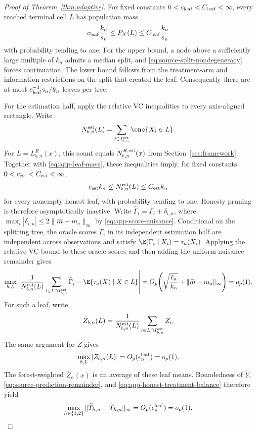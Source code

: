 \begin{appendix}
\begin{proof}[Proof of Theorem~\ref{thm:adaptive}]
For fixed constants \(0<c_{\rm leaf}<C_{\rm leaf}<\infty\), every reached
terminal cell \(L\) has population mass
\begin{equation}\label{eq:app-leaf-mass}
c_{\rm leaf}\frac{k_n}{s_n}\le P_X(L)\le
C_{\rm leaf}\frac{k_n}{s_n}
\end{equation}
with probability tending to one. For the upper bound, a node above a
sufficiently large multiple of \(k_n\) admits a median split, and
\eqref{eq:source-split-nondegeneracy} forces continuation. The lower bound
follows from the treatment-arm and information restrictions on the split that
created the leaf. Consequently there are at most
\(c_{\rm leaf}^{-1}s_n/k_n\) leaves per tree.

For the estimation half, apply the relative VC inequalities to every
axis-aligned rectangle. Write
\[
N_{b,n}^{\rm est}(L)
=\sum_{i\in I_{b,n}^{\rm est}}\one\{X_i\in L\}.
\]
For \(L=L_{b,n}^R(x)\), this count equals
\(N_{b,n}^{R,{\rm est}}(x)\) from Section~\ref{sec:framework}.
Together with \eqref{eq:app-leaf-mass}, these inequalities imply, for fixed
constants \(0<c_{\rm est}<C_{\rm est}<\infty\),
\begin{equation*}
c_{\rm est}k_n\le N_{b,n}^{\rm est}(L)\le C_{\rm est}k_n
\end{equation*}
for every nonempty honest leaf, with probability tending to one. Honesty
pruning is therefore asymptotically inactive. Write
\(\widehat\Gamma_i=\Gamma_i+\delta_{i,n}\), where
\(\max_i|\delta_{i,n}|\le2\|\widehat m-m_a\|_\infty\) by
\eqref{eq:app-score-nuisance}. Conditional on the splitting tree, the oracle
scores \(\Gamma_i\) in its independent estimation half are independent across
observations and satisfy \(\E(\Gamma_i\mid X_i)=\tau_a(X_i)\). Applying the
relative-VC bound to these oracle scores and
then adding the uniform nuisance remainder gives
\begin{equation}\label{eq:app-honest-moment}
\max_{b,L}\left|
\frac1{N_{b,n}^{\rm est}(L)}
\sum_{i\in L\cap I_{b,n}^{\rm est}}\widehat\Gamma_i
-\E\{\tau_a(X)\mid X\in L\}
\right|
=O_p\!\left(\sqrt{\frac{\ell_n}{k_n}}
+\|\widehat m-m_a\|_\infty\right)=o_p(1).
\end{equation}
For such a leaf, write
\[
\bar Z_{b,n}(L)
=\frac{1}{N_{b,n}^{\rm est}(L)}
\sum_{i\in L\cap I_{b,n}^{\rm est}}Z_i.
\]
The same argument for \(Z\) gives
\begin{equation}\label{eq:app-honest-treatment-balance}
\max_{b,L}|\bar Z_{b,n}(L)|=O_p(\epsilon_n^{\rm leaf})=o_p(1).
\end{equation}
The forest-weighted \(\bar Z_\alpha(x)\) is an average of these leaf means.
Boundedness of \(\widetilde Y\), \eqref{eq:source-prediction-remainder}, and
\eqref{eq:app-honest-treatment-balance} therefore yield
\begin{equation}\label{eq:app-source-prediction-transfer}
\max_{h\in\{1,2\}}
\|\widehat T_{h,n}-\check T_{h,n}\|_\infty
=O_p(\epsilon_n^{\rm leaf})=o_p(1).
\end{equation}


\end{proof}
\end{appendix}
